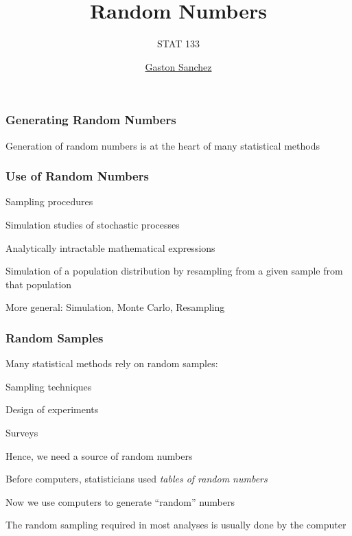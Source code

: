\documentclass[12pt]{beamer}\usepackage[]{graphicx}\usepackage[]{color}
\title{Random Numbers}
\subtitle{STAT 133}
\author{\href{http://www.gastonsanchez.com}{Gaston Sanchez}}
\institute{\href{https://github.com/ucb-stat133/stat133-fall-2016}{\tt \scriptsize \color{foreground} github.com/ucb-stat133/stat133-fall-2016}}
\date{}
\begin{document}
{
  \frame{
    \titlepage
  } 
}


\begin{frame}
\begin{center}
\Huge{}
\end{center}
\end{frame}


\begin{frame}
\frametitle{Generating Random Numbers}

\Large Generation of random numbers is at the heart of many statistical methods

\end{frame}


\begin{frame}
\frametitle{Use of Random Numbers}

\bbi
  \item Sampling procedures
  \item Simulation studies of stochastic processes
  \item Analytically intractable mathematical expressions
  \item Simulation of a population distribution by resampling from a given sample from that population
  \item More general: Simulation, Monte Carlo, Resampling
\ei
\eb

\end{frame}


\begin{frame}
\frametitle{Random Samples}

\bi
  \item Many statistical methods rely on random samples:
  \bi
    \item Sampling techniques
    \item Design of experiments
    \item Surveys
  \ei
  \item Hence, we need a source of random numbers
  \item Before computers, statisticians used \textit{tables of random numbers}
  \item Now we use computers to generate ``random'' numbers
  \item The random sampling required in most analyses is usually done by the computer
\ei

\end{frame}
\end{document}
